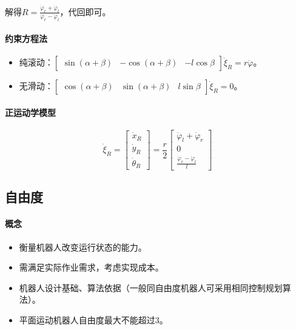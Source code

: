 \documentclass[
12pt, %
a4paper, 
oneside, %
headinclude,footinclude, %
]{scrartcl}
\begin{document}
解得$ R = \frac{\dot{\varphi}_r + \dot{\varphi}_l}{\dot{\varphi}_r - \dot{\varphi}_l} $，代回即可。
\paragraph{约束方程法}
\begin{itemize}
\item 纯滚动：$ \begin{bmatrix} \sin(\alpha + \beta) & -\cos(\alpha + \beta) & -l\cos\beta \end{bmatrix} \dot{\xi}_R = r\dot{\varphi} $。
\item 无滑动：$ \begin{bmatrix} \cos(\alpha + \beta) & \sin(\alpha + \beta) & l\sin\beta \end{bmatrix} \dot{\xi}_R = 0 $。
\end{itemize}
\paragraph{正运动学模型}
$$ \dot{\xi}_R = \begin{bmatrix} \dot{x}_R \\ \dot{y}_R \\ \dot{\theta}_R \end{bmatrix} = \frac{r}{2} \begin{bmatrix} \dot{\varphi}_l + \dot{\varphi}_r \\ 0 \\ \frac{\dot{\varphi}_r - \dot{\varphi}_l}{l} \end{bmatrix} $$
\subsection[自由度]{自由度}
\paragraph{概念}
\begin{itemize}
\item 衡量机器人改变运行状态的能力。
\item 需满足实际作业需求，考虑实现成本。
\item 机器人设计基础、算法依据（一般同自由度机器人可采用相同控制规划算法）。
\item 平面运动机器人自由度最大不能超过$ 3 $。
\end{itemize}
\end{document}
